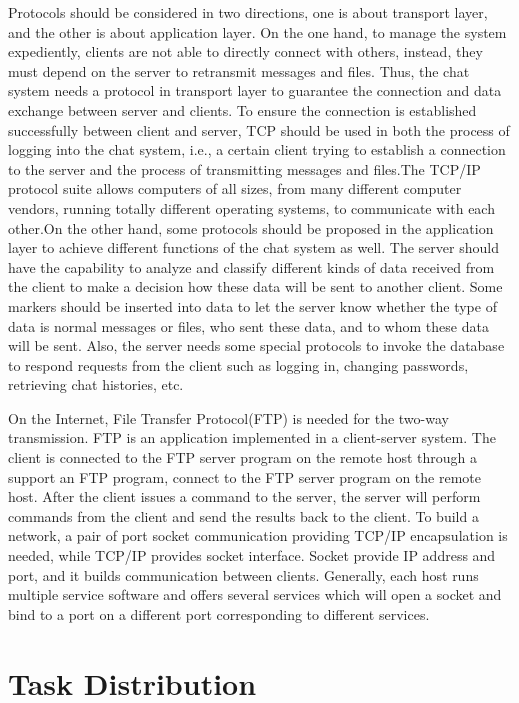 \documentclass{article}
\begin{document}
Protocols should be considered in two directions, one is about transport layer, and the other is about application layer. On the one hand, to manage the system expediently, clients are not able to directly connect with others, instead, they must depend on the server to retransmit messages and files. Thus, the chat system needs a protocol in transport layer to guarantee the connection and data exchange between server and clients. To ensure the connection is established successfully between client and server, TCP should be used in both the process of logging into the chat system, i.e., a certain client trying to establish a connection to the server and the process of transmitting messages and files.The TCP/IP protocol suite allows computers of all sizes, from many different computer vendors, running totally different operating systems, to communicate with each other.\cite{bib5}On the other hand, some protocols should be proposed in the application layer to achieve different functions of the chat system as well. The server should have the capability to analyze and classify different kinds of data received from the client to make a decision how these data will be sent to another client. Some markers should be inserted into data to let the server know whether the type of data is normal messages or files, who sent these data, and to whom these data will be sent. Also, the server needs some special protocols to invoke the database to respond requests from the client such as logging in, changing passwords, retrieving chat histories, etc. 

On the Internet, File Transfer Protocol(FTP) is needed for the two-way transmission. FTP is an application implemented in a client-server system. The client is connected to the FTP server program on the remote host through a support an FTP program, connect to the FTP server program on the remote host. After the client issues a command to the server, the server will perform commands from the client and send the results back to the client. To build a network, a pair of port socket communication providing TCP/IP encapsulation is needed, while TCP/IP provides socket interface. Socket provide IP address and port, and it builds communication between clients. Generally, each host runs multiple service software and offers several services which will open a socket and bind to a port on a different port corresponding to different services.\cite{bib3}



\section{Task Distribution}
\end{document}
